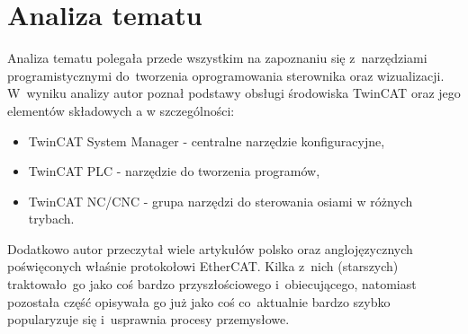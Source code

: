 \section{Analiza tematu}
Analiza tematu polegała przede wszystkim na zapoznaniu się z~narzędziami programistycznymi do~tworzenia oprogramowania sterownika oraz wizualizacji.
W~wyniku analizy autor poznał podstawy obsługi środowiska TwinCAT oraz jego elementów składowych a w szczególności:
\begin{itemize}
\item TwinCAT System Manager - centralne narzędzie konfiguracyjne,
\item TwinCAT PLC - narzędzie do tworzenia programów,
\item TwinCAT NC/CNC - grupa narzędzi do sterowania osiami w różnych trybach.
\end{itemize} 

Dodatkowo autor przeczytał wiele artykułów polsko oraz anglojęzycznych poświęconych właśnie protokołowi EtherCAT. Kilka z~nich (starszych) traktowało~go jako coś bardzo przyszłościowego i~obiecującego, natomiast pozostała część opisywała go już jako coś co~aktualnie bardzo szybko popularyzuje się i~usprawnia procesy przemysłowe.



